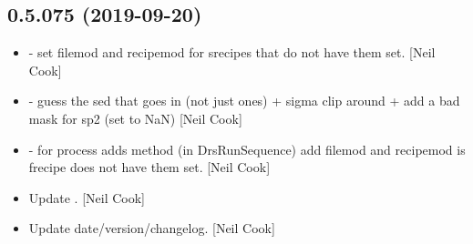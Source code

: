\documentclass[a4paper,10pt,english]{report}
\begin{document}
\subsection{0.5.075 (2019-09-20)}
\label{\detokenize{misc/changelog:id67}}\begin{itemize}
\item {} 
 - set filemod and recipemod for
srecipes that do not have them set. {[}Neil Cook{]}

\item {} 
 - guess the sed that goes in (not just
ones) + sigma clip around  + add a bad mask for sp2 (set to NaN)
{[}Neil Cook{]}

\item {} 
 - for process adds method (in DrsRunSequence) add
filemod and recipemod is frecipe does not have them set. {[}Neil Cook{]}

\item {} 
Update . {[}Neil Cook{]}

\item {} 
Update date/version/changelog. {[}Neil Cook{]}

\end{itemize}
\end{document}
